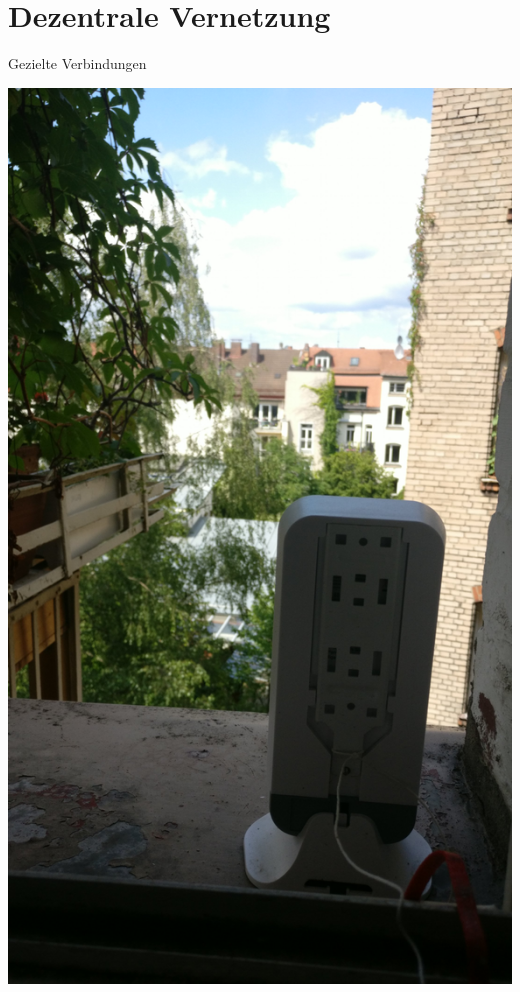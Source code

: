 \documentclass{beamer}
\begin{document}
	\section{Dezentrale Vernetzung}
	\begin{frame}[standout]{Gezielte Verbindungen}

        \includegraphics[height=\framewidth]{media/p2p-fensterbrett1.jpg}
	\end{frame}
\end{document}
